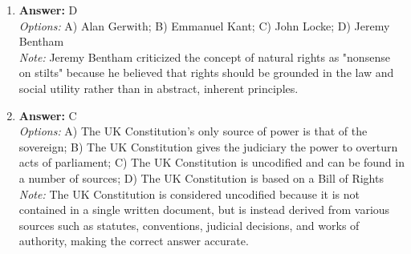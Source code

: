\documentclass[12pt]{article}
\begin{document}
\begin{enumerate}[label=\arabic*.]
\item \textbf{Answer:} D
\\ \textit{Options:} A) Alan Gerwith; B) Emmanuel Kant; C) John Locke; D) Jeremy Bentham
\\ \textit{Note:} Jeremy Bentham criticized the concept of natural rights as "nonsense on stilts" because he believed that rights should be grounded in the law and social utility rather than in abstract, inherent principles.
\item \textbf{Answer:} C
\\ \textit{Options:} A) The UK Constitution's only source of power is that of the sovereign; B) The UK Constitution gives the judiciary the power to overturn acts of parliament; C) The UK Constitution is uncodified and can be found in a number of sources; D) The UK Constitution is based on a Bill of Rights
\\ \textit{Note:} The UK Constitution is considered uncodified because it is not contained in a single written document, but is instead derived from various sources such as statutes, conventions, judicial decisions, and works of authority, making the correct answer accurate.
\end{enumerate}
\end{document}
